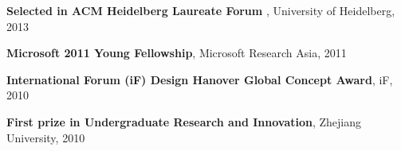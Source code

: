\documentclass[margin,line]{res}
\begin{document}
\begin{resume}


%

\textbf{Selected in ACM Heidelberg Laureate Forum }, University of Heidelberg, 2013


\textbf{Microsoft 2011 Young Fellowship}, Microsoft Research Asia, 2011


\textbf{International Forum (iF) Design Hanover Global Concept Award}, iF, 2010 

\textbf{First prize in Undergraduate Research and Innovation}, Zhejiang University, 2010   





%
%
%     
%
%
%	
%	
%
%



\end{resume}
\end{document}
